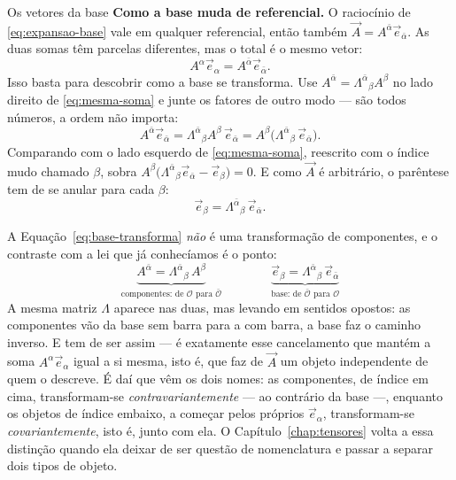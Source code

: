 \documentclass[12pt,a4paper,oneside]{book}
\theoremstyle{rgplain}
\theoremstyle{rgremark}
\newcommand{\obs}{\mathcal{O}}
\newcommand{\obsl}{\bar{\mathcal{O}}}
\begin{document}
\begin{interludio}{Os vetores da base}
\textbf{Como a base muda de referencial.} O raciocínio de
\eqref{eq:expansao-base} vale em qualquer referencial, então também
$\vec A=A^{\bar\alpha}\vec e_{\bar\alpha}$. As duas somas têm parcelas diferentes,
mas o total é o mesmo vetor:
\begin{equation}
  A^\alpha\vec e_\alpha=A^{\bar\alpha}\vec e_{\bar\alpha} .
  \label{eq:mesma-soma}
\end{equation}
Isso basta para descobrir como a base se transforma. Use
$A^{\bar\alpha}=\Lambda^{\bar\alpha}{}_{\beta}A^{\beta}$ no lado direito de
\eqref{eq:mesma-soma} e junte os fatores de outro modo --- são todos números,
a ordem não importa:
\[
  A^{\bar\alpha}\vec e_{\bar\alpha}
  =\Lambda^{\bar\alpha}{}_{\beta}A^{\beta}\,\vec e_{\bar\alpha}
  =A^{\beta}\bigl(\Lambda^{\bar\alpha}{}_{\beta}\,\vec e_{\bar\alpha}\bigr).
\]
Comparando com o lado esquerdo de \eqref{eq:mesma-soma}, reescrito com o índice
mudo chamado $\beta$, sobra
$A^\beta\bigl(\Lambda^{\bar\alpha}{}_{\beta}\vec e_{\bar\alpha}-\vec e_\beta\bigr)=0$.
E como $\vec A$ é arbitrário, o parêntese tem de se anular para cada $\beta$:
\begin{equation}
  \vec e_\beta=\Lambda^{\bar\alpha}{}_{\beta}\,\vec e_{\bar\alpha} .
  \label{eq:base-transforma}
\end{equation}

A Equação~\eqref{eq:base-transforma} \emph{não} é uma transformação de
componentes, e o contraste com a lei que já conhecíamos é o ponto:
\[
  \underbrace{A^{\bar\alpha}=\Lambda^{\bar\alpha}{}_{\beta}\,A^{\beta}}
    _{\text{componentes: de }\obs\text{ para }\obsl}
  \qquad\qquad
  \underbrace{\vec e_\beta=\Lambda^{\bar\alpha}{}_{\beta}\,\vec e_{\bar\alpha}}
    _{\text{base: de }\obsl\text{ para }\obs}
\]
A mesma matriz $\Lambda$ aparece nas duas, mas levando em sentidos opostos: as
componentes vão da base sem barra para a com barra, a base faz o caminho
inverso. E tem de ser assim --- é exatamente esse cancelamento que mantém a
soma $A^\alpha\vec e_\alpha$ igual a si mesma, isto é, que faz de $\vec A$ um
objeto independente de quem o descreve. É daí que vêm os dois nomes: as
componentes, de índice em cima, transformam-se \emph{contravariantemente}
--- ao contrário da base ---, enquanto os objetos de índice embaixo, a começar
pelos próprios $\vec e_\alpha$, transformam-se \emph{covariantemente}, isto é,
junto com ela. O Capítulo~\ref{chap:tensores} volta a essa distinção quando ela
deixar de ser questão de nomenclatura e passar a separar dois tipos de objeto.


\end{interludio}
\end{document}
